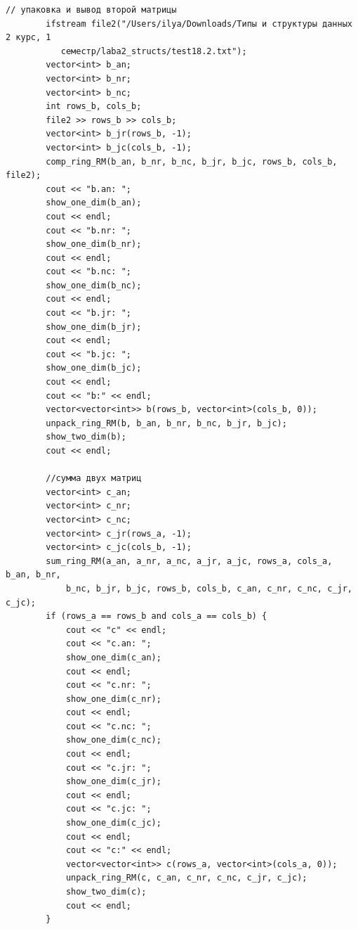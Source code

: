 \documentclass[12pt, a4paper]{article}
\begin{document}
\begin{lstlisting}[caption={Исходный код}, label={lst:label1}]
        // упаковка и вывод второй матрицы
        ifstream file2("/Users/ilya/Downloads/Типы и структуры данных 2 курс, 1 
           семестр/laba2_structs/test18.2.txt");
        vector<int> b_an;
        vector<int> b_nr;
        vector<int> b_nc;
        int rows_b, cols_b;
        file2 >> rows_b >> cols_b;
        vector<int> b_jr(rows_b, -1);
        vector<int> b_jc(cols_b, -1);
        comp_ring_RM(b_an, b_nr, b_nc, b_jr, b_jc, rows_b, cols_b, file2);
        cout << "b.an: ";
        show_one_dim(b_an);
        cout << endl;
        cout << "b.nr: ";
        show_one_dim(b_nr);
        cout << endl;
        cout << "b.nc: ";
        show_one_dim(b_nc);
        cout << endl;
        cout << "b.jr: ";
        show_one_dim(b_jr);
        cout << endl;
        cout << "b.jc: ";
        show_one_dim(b_jc);
        cout << endl;
        cout << "b:" << endl;
        vector<vector<int>> b(rows_b, vector<int>(cols_b, 0));
        unpack_ring_RM(b, b_an, b_nr, b_nc, b_jr, b_jc);
        show_two_dim(b);
        cout << endl;
        
        //сумма двух матриц
        vector<int> c_an;
        vector<int> c_nr;
        vector<int> c_nc;
        vector<int> c_jr(rows_a, -1);
        vector<int> c_jc(cols_b, -1);
        sum_ring_RM(a_an, a_nr, a_nc, a_jr, a_jc, rows_a, cols_a, b_an, b_nr, 
            b_nc, b_jr, b_jc, rows_b, cols_b, c_an, c_nr, c_nc, c_jr, c_jc);
        if (rows_a == rows_b and cols_a == cols_b) {
            cout << "c" << endl;
            cout << "c.an: ";
            show_one_dim(c_an);
            cout << endl;
            cout << "c.nr: ";
            show_one_dim(c_nr);
            cout << endl;
            cout << "c.nc: ";
            show_one_dim(c_nc);
            cout << endl;
            cout << "c.jr: ";
            show_one_dim(c_jr);
            cout << endl;
            cout << "c.jc: ";
            show_one_dim(c_jc);
            cout << endl;
            cout << "c:" << endl;
            vector<vector<int>> c(rows_a, vector<int>(cols_a, 0));
            unpack_ring_RM(c, c_an, c_nr, c_nc, c_jr, c_jc);
            show_two_dim(c);
            cout << endl;
        }
        

\end{lstlisting}
\end{document}
